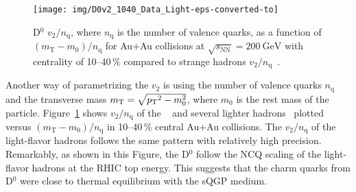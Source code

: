 \begin{figure}[!htb]
\begin{center}
  \texttt{[image: img/D0v2\_1040\_Data\_Light-eps-converted-to]}\\
\end{center}
\caption[D$^0$ $v_2/n_\mathrm{q}$ as a function of $(m_\mathrm{T} - m_0)/n_\mathrm{q}$ for Au+Au collisions.]{\label{dzerov2NCQ}D$^0$ $v_2/n_\mathrm{q}$, where $n_\mathrm{q}$ is the number of valence quarks, as a function of $(m_\mathrm{T} - m_0)/n_\mathrm{q}$ for Au+Au collisions
at $\sqrt{s_\mathrm{NN}} = \SI{200}{\giga\electronvolt}$ with centrality of 10--40$\,\%$ compared to strange hadrons $v_2/n_\mathrm{q}$~\cite{D0v2paper,StrangeAndChargedv2paper}.}
\end{figure}


Another way of parametrizing the $v_2$ is using the number of valence quarks $n_\mathrm{q}$ and the transverse mass $m_\mathrm{T}= \sqrt{{p_{\mathrm{T}}}^2 - m_0^2}$, where $m_0$ is the rest mass of the particle. Figure~\ref{dzerov2NCQ} shows $v_2 / n_\mathrm{q}$ of the \dzero~\cite{D0v2paper} and several lighter hadrons~\cite{StrangeAndChargedv2paper} plotted versus $(m_\mathrm{T} - m_0)/n_\mathrm{q}$ in 10--40$\,\%$ central Au+Au collisions\@. The $v_2/n_\mathrm{q}$ of the light-flavor hadrons follows the same pattern with relatively high precision. Remarkably, as shown in this Figure, the D$^0$ follow the NCQ scaling of the light-flavor hadrons at the RHIC top energy. This suggests that the charm quarks from D$^0$ were close to thermal equilibrium with the sQGP medium.

% 


